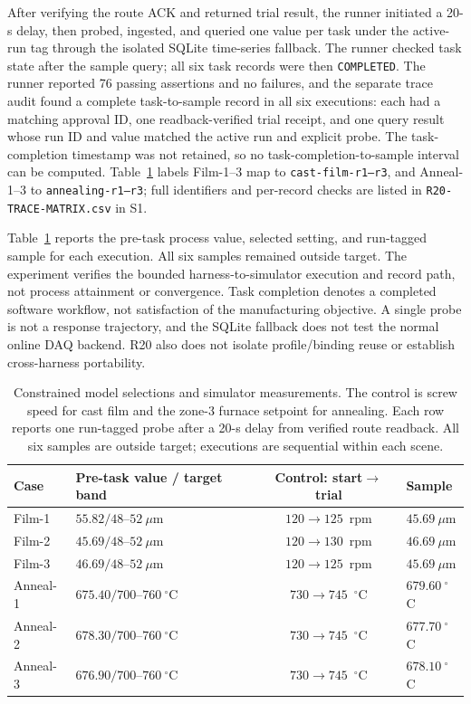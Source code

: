 After verifying the route ACK and returned trial result, the runner initiated
a 20-s delay, then probed, ingested, and queried one value per task under the
active-run tag through the isolated SQLite time-series fallback. The runner
checked task state after the sample query; all six task records were then
\texttt{COMPLETED}. The runner reported 76 passing assertions and no failures, and
the separate trace audit found a complete task-to-sample record in all six
executions: each had a matching approval ID, one readback-verified trial
receipt, and one query result whose run ID and value matched the active run and
explicit probe. The task-completion timestamp was not retained, so no
task-completion-to-sample interval can be computed. Table~\ref{tab:q8} labels
Film-1--3 map to \texttt{cast-film-r1--r3}, and Anneal-1--3 to
\texttt{annealing-r1--r3}; full identifiers and per-record checks are listed
in \texttt{R20-TRACE-MATRIX.csv} in S1.

Table~\ref{tab:q8} reports the pre-task process value, selected setting, and
run-tagged sample for each execution. All six samples remained outside target.
The experiment verifies the bounded harness-to-simulator execution and record
path, not process attainment or convergence. Task completion denotes a
completed software workflow, not satisfaction of the manufacturing objective.
A single probe is not a response trajectory, and the SQLite fallback does not
test the normal online DAQ backend. R20 also does not isolate
profile/binding reuse or establish cross-harness portability.

\begin{table}[!t]
\centering
\caption{Constrained model selections and simulator measurements. The control
is screw speed for cast film and the zone-3 furnace setpoint for annealing.
Each row reports one run-tagged probe after a 20-s delay from verified route
readback. All six samples are outside target; executions are sequential within
each scene.}
\label{tab:q8}
\footnotesize
\setlength{\tabcolsep}{2.5pt}
\begin{tabularx}{\columnwidth}{@{}lXcX@{}}
\toprule
Case & Pre-task value / target band & Control: start$\to$trial & Sample \\
\midrule
Film-1 & $55.82/48$--$52~\mu$m & $120\to125$~rpm & $45.69~\mu$m \\
Film-2 & $45.69/48$--$52~\mu$m & $120\to130$~rpm & $46.69~\mu$m \\
Film-3 & $46.69/48$--$52~\mu$m & $120\to125$~rpm & $45.69~\mu$m \\
Anneal-1 & $675.40/700$--$760~^{\circ}$C & $730\to745$~$^{\circ}$C & $679.60~^{\circ}$C \\
Anneal-2 & $678.30/700$--$760~^{\circ}$C & $730\to745$~$^{\circ}$C & $677.70~^{\circ}$C \\
Anneal-3 & $676.90/700$--$760~^{\circ}$C & $730\to745$~$^{\circ}$C & $678.10~^{\circ}$C \\
\bottomrule
\end{tabularx}
\end{table}

